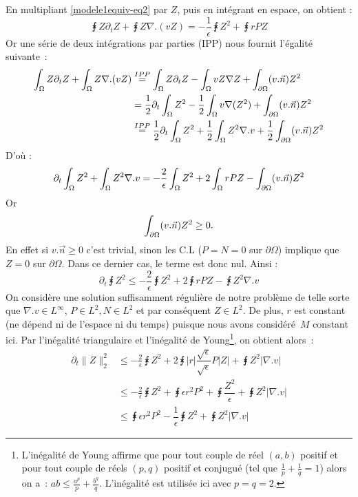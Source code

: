 \documentclass[main.tex]{subfiles}
\begin{document}
En multipliant \eqref{modele1equiv-eq2} par $Z$, puis en intégrant en espace, on obtient :
\begin{equation}
\intx Z \partial_t Z + \intx Z \nabla.(vZ) = - \frac{1}{\epsilon} \intx Z^2 + \intx rPZ
\end{equation}
Or une série de deux intégrations par parties (IPP) nous fournit l'égalité suivante~:
\begin{align*}
\int_\Omega Z \partial_t Z + \int_\Omega Z \nabla.(vZ) & \overset{IPP}{=} \int_\Omega Z \partial_t Z - \int_\Omega v Z \nabla Z + \int_{\partial \Omega} (v.\vec{n}) Z^2 \\
&= \frac{1}{2} \partial_t \int_\Omega Z^2 - \frac{1}{2} \int_\Omega v \nabla (Z^2) + \int_{\partial \Omega} (v.\vec{n}) Z^2 \\
& \overset{IPP}{=} \frac{1}{2} \partial_t \int_\Omega Z^2 + \frac{1}{2} \int_\Omega Z^2 \nabla.v + \frac{1}{2} \int_{\partial \Omega} (v.\vec{n}) Z^2 \\
\end{align*}
D'où :
\begin{equation}
\partial_t \int_\Omega Z^2 + \int_\Omega Z^2 \nabla.v = - \frac{2}{\epsilon} \int_\Omega Z^2 + 2 \int_\Omega rPZ - \int_{\partial \Omega} (v.\vec{n}) Z^2
\end{equation}
Or
\begin{equation}
\int_{\partial \Omega} (v.\vec{n}) Z^2 \geq 0.
\end{equation}
En effet si $v.\vec{n} \geq 0$ c'est trivial, sinon les C.L ($P=N=0$ sur $\partial \Omega$) implique que $Z=0$ sur $\partial \Omega$. Dans ce dernier cas, le terme est donc nul. Ainsi :
\begin{equation}
 \partial_t \intx Z^2 \leq - \frac{2}{\epsilon} \intx Z^2 + 2 \intx rPZ - \intx Z^2 \nabla.v
\end{equation}
On considère une solution suffisamment régulière de notre problème de telle sorte que $\nabla.v \in L^\infty$, $P \in L^2, N \in L^2$ et par conséquent $Z \in L^2$. De plus, $r$ est constant (\ie ne dépend ni de l'espace ni du temps) puisque nous avons considéré~$M$ constant ici. Par l'inégalité triangulaire et l'inégalité de Young\footnote{L'inégalité de Young affirme que pour tout couple de réel $(a,b)$ positif et pour tout couple de réels $(p,q)$ positif et conjugué (\ie tel que $\frac{1}{p}+\frac{1}{q}=1$) alors on a~: $ab \leq \frac{a^p}{p} + \frac{b^q}{q}$. L'inégalité est utilisée ici avec $p=q=2$. }, 
on obtient alors~:
\begin{align*}
\partial_t \| Z \|^2_2 & \leq -\frac{2}{\epsilon} \intx Z^2 + 2 \intx  |r| \dfrac{\sqrt{\epsilon}}{\sqrt{\epsilon}} P|Z| + \intx Z^2 | \nabla.v | \\
& \leq -\frac{2}{\epsilon} \intx Z^2 + \intx \epsilon r^2 P^2 + \intx \dfrac{Z^2}{\epsilon}  + \intx Z^2 | \nabla.v | \\
& \leq \intx \epsilon r^2 P^2 - \dfrac{1}{\epsilon} \intx Z^2  + \intx Z^2 | \nabla.v | 
\end{align*}
\end{document}
